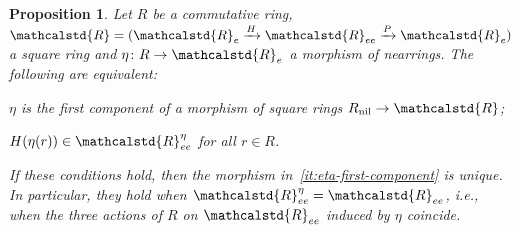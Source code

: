 \documentclass[reqno,a4paper]{amsart}
\theoremstyle{plain}
\newtheorem{proposition}[subsection]{Proposition}
\theoremstyle{definition}
\newcommand{\R}{\ensuremath{\mathcalstd{R}}}
\DeclareMathOperator{\nil}{nil}
\newcommand{\sqring}[4]{\ensuremath{(#1\xrightarrow{#3}#2\xrightarrow{#4}#1)}}
\renewcommand{\Re}{\ensuremath{\R_{e}}}
\newcommand{\Ree}{\ensuremath{\R_{ee}}}
\begin{document}
\begin{proposition}\label{prop:morphisms-from-R-nil}
  Let \(R\) be a commutative ring, \(\R=\sqring{\Re}{\Ree}{H}{P}\) a square ring and \(\eta\colon R\to\Re\) a morphism of nearrings. The following are equivalent:
  \begin{tfae}
    \item\label{it:eta-first-component} \(\eta\) is the first component of a morphism of square rings \(R_{\nil}\to\R\);
    \item\label{it:H-eta-balanced} \(H(\eta(r))\in\Ree^{\eta}\) for all \(r\in R\).
  \end{tfae}
  If these conditions hold, then the morphism in~\ref{it:eta-first-component} is unique. In particular, they hold when \(\Ree^{\eta}=\Ree\), i.e., when the three actions of \(R\) on \(\Ree\) induced by \(\eta\) coincide.
\end{proposition}
\end{document}
